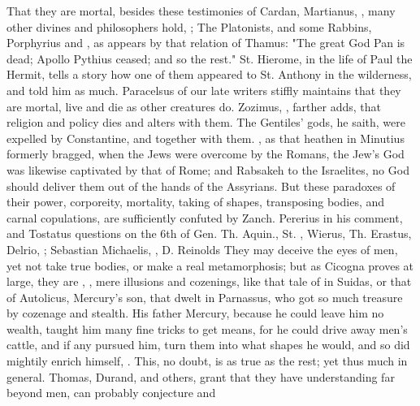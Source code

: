 That they are mortal, besides these testimonies of Cardan, Martianus, \etc{},
many other divines and philosophers hold, ; The Platonists, and some Rabbins, Porphyrius and
\Plutarch{}, as appears by that relation of Thamus: "The
great God Pan is dead; Apollo Pythius ceased; and so the rest." St. Hierome, in
the life of Paul the Hermit, tells a story how one of them appeared to St.
Anthony in the wilderness, and told him as much.
Paracelsus of our late writers stiffly maintains that they
are mortal, live and die as other creatures do. Zozimus,
, farther adds, that religion and policy dies and
alters with them. The Gentiles' gods, he saith, were
expelled by Constantine, and together with them. , as that heathen in Minutius
formerly bragged, when the Jews were overcome by the Romans, the Jew's God was
likewise captivated by that of Rome; and Rabsakeh to the Israelites, no God
should deliver them out of the hands of the Assyrians. But these paradoxes of
their power, corporeity, mortality, taking of shapes, transposing bodies, and
carnal copulations, are sufficiently confuted by Zanch.  Pererius in his comment, and Tostatus questions on the 6th of Gen.
Th. Aquin., St. \Austin{}, Wierus, Th. Erastus, Delrio, ; Sebastian Michaelis, , D. Reinolds  They may deceive the
eyes of men, yet not take true bodies, or make a real metamorphosis; but as
Cicogna proves at large, they are , , mere illusions and cozenings, like that tale of 
in Suidas, or that of Autolicus, Mercury's son, that dwelt in Parnassus, who
got so much treasure by cozenage and stealth. His father Mercury, because he
could leave him no wealth, taught him many fine tricks to get means,
for he could drive away men's cattle, and if any pursued
him, turn them into what shapes he would, and so did mightily enrich himself,
. This, no doubt, is as true as the
rest; yet thus much in general. Thomas, Durand, and others, grant that they
have understanding far beyond men, can probably conjecture and
